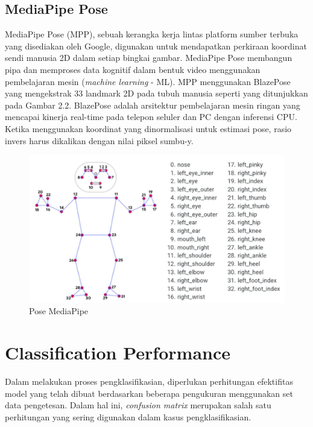 \subsection{MediaPipe Pose}
MediaPipe Pose (MPP), sebuah kerangka kerja lintas platform sumber terbuka yang disediakan oleh Google, digunakan untuk mendapatkan perkiraan koordinat sendi manusia 2D dalam setiap bingkai gambar. MediaPipe Pose membangun pipa dan memproses data kognitif dalam bentuk video menggunakan pembelajaran mesin (\emph{machine learning} - ML). MPP menggunakan BlazePose yang mengekstrak 33 landmark 2D pada tubuh manusia seperti yang ditunjukkan pada Gambar 2.2. BlazePose adalah arsitektur pembelajaran mesin ringan yang mencapai kinerja real-time pada telepon seluler dan PC dengan inferensi CPU. Ketika menggunakan koordinat yang dinormalisasi untuk estimasi pose, rasio invers harus dikalikan dengan nilai piksel sumbu-y. \parencite{MediapipePose}

\begin{figure}[H]
  \centering

  \includegraphics[scale=0.6]{gambar/mp_pose.jpg}

  \caption{Pose MediaPipe}
  \label{fig:Pose MediaPipe}
\end{figure}

\section{Classification Performance}
Dalam melakukan proses pengklasifikasian, diperlukan perhitungan efektifitas model yang telah dibuat berdasarkan beberapa pengukuran menggunakan set data pengetesan. Dalam hal ini, \emph{confusion matrix} merupakan salah satu perhitungan yang sering digunakan dalam kasus pengklasifikasian.

